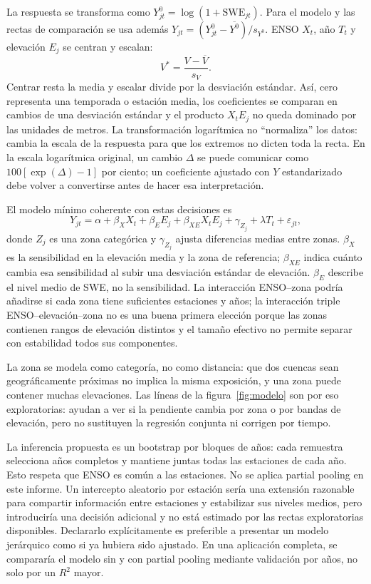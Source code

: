 \documentclass[10pt,a4paper]{article}
\begin{document}
La respuesta se transforma como \(Y_{jt}^{0}=\log(1+\mathrm{SWE}_{jt})\).
Para el modelo y las rectas de comparación se usa además
\(Y_{jt}=(Y_{jt}^{0}-\overline{Y^{0}})/s_{Y^{0}}\). ENSO \(X_t\), año \(T_t\)
y elevación \(E_j\) se centran y escalan:
\[
V^{*}=\frac{V-\overline V}{s_V}.
\]
Centrar resta la media y escalar divide por la desviación estándar. Así,
cero representa una temporada o estación media, los coeficientes se
comparan en cambios de una desviación estándar y el producto \(X_tE_j\) no
queda dominado por las unidades de metros. La transformación logarítmica no
``normaliza'' los datos: cambia la escala de la respuesta para que los
extremos no dicten toda la recta. En la escala logarítmica original, un cambio
\(\Delta\) se puede comunicar como \(100[\exp(\Delta)-1]\) por ciento; un
coeficiente ajustado con \(Y\) estandarizado debe volver a convertirse antes
de hacer esa interpretación.

El modelo mínimo coherente con estas decisiones es
\[
Y_{jt}=\alpha+\beta_X X_t+\beta_E E_j+\beta_{XE}X_tE_j+
\gamma_{Z_j}+\lambda T_t+\varepsilon_{jt},
\]
donde \(Z_j\) es una zona categórica y \(\gamma_{Z_j}\) ajusta diferencias
medias entre zonas. \(\beta_X\) es la sensibilidad en la elevación media y
la zona de referencia; \(\beta_{XE}\) indica cuánto cambia esa sensibilidad al
subir una desviación estándar de elevación. \(\beta_E\) describe el nivel
medio de SWE, no la sensibilidad. La interacción ENSO--zona podría añadirse
si cada zona tiene suficientes estaciones y años; la interacción triple
ENSO--elevación--zona no es una buena primera elección porque las zonas
contienen rangos de elevación distintos y el tamaño efectivo no permite
separar con estabilidad todos sus componentes.

La zona se modela como categoría, no como distancia: que dos cuencas sean
geográficamente próximas no implica la misma exposición, y una zona puede
contener muchas elevaciones. Las líneas de la figura~\ref{fig:modelo} son
por eso exploratorias: ayudan a ver si la pendiente cambia por zona o por
bandas de elevación, pero no sustituyen la regresión conjunta ni corrigen por
tiempo.

La inferencia propuesta es un bootstrap por bloques de años: cada remuestra
selecciona años completos y mantiene juntas todas las estaciones de cada año.
Esto respeta que ENSO es común a las estaciones. No se aplica partial pooling
en este informe. Un intercepto aleatorio por estación sería una extensión
razonable para compartir información entre estaciones y estabilizar sus
niveles medios, pero introduciría una decisión adicional y no está estimado
por las rectas exploratorias disponibles. Declararlo explícitamente es
preferible a presentar un modelo jerárquico como si ya hubiera sido ajustado.
En una aplicación completa, se compararía el modelo sin y con partial pooling
mediante validación por años, no solo por un \(R^2\) mayor.
\end{document}
